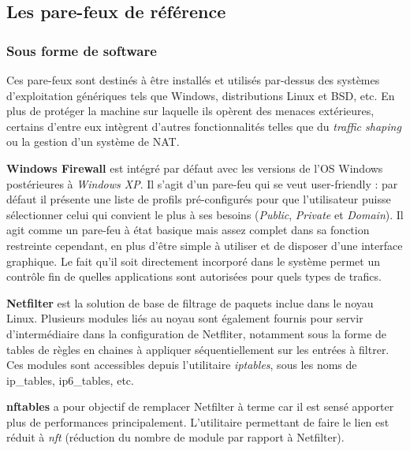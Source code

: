 \documentclass[]{article}
\newcommand{\minit}[1]{\noindent{\small\textbf{ \underline{#1}}}\vspace{0.2cm}}
\begin{document}
\newpage
\subsection{Les pare-feux de référence}

\subsubsection{Sous forme de software}

\par Ces pare-feux sont destinés à être installés et utilisés par-dessus des systèmes d'exploitation génériques tels que Windows, distributions Linux et BSD, etc. En plus de protéger la machine sur laquelle ils opèrent des menaces extérieures, certains d'entre eux intègrent d'autres fonctionnalités telles que du \textit{traffic shaping} ou la gestion d'un système de NAT.\\

\minit{Windows}

\par \textbf{Windows Firewall} est intégré par défaut avec les versions de l'OS Windows postérieures à \textit{Windows XP}. Il s'agit d'un pare-feu qui se veut \og user-friendly \fg : par défaut il présente une liste de profils pré-configurés pour que l'utilisateur puisse sélectionner celui qui convient le plus à ses besoins (\textit{Public}, \textit{Private} et \textit{Domain}). Il agit comme un pare-feu à état basique mais assez complet dans sa fonction restreinte cependant, en plus d'être simple à utiliser et de disposer d'une interface graphique. Le fait qu'il soit directement incorporé dans le système permet un contrôle fin de quelles applications sont autorisées pour quels types de trafics.\\

\minit{Linux}

\par \textbf{Netfilter} est la solution de base de filtrage de paquets inclue dans le noyau Linux. Plusieurs modules liés au noyau sont également fournis pour servir d'intermédiaire dans la configuration de Netfliter, notamment sous la forme de tables de règles en chaines à appliquer séquentiellement sur les entrées à filtrer. Ces modules sont accessibles depuis l'utilitaire \textit{iptables}, sous les noms de ip\_tables, ip6\_tables, etc.\\

\par \textbf{nftables} a pour objectif de remplacer Netfilter à terme car il est sensé apporter plus de performances principalement. L'utilitaire permettant de faire le lien est réduit à \textit{nft} (réduction du nombre de module par rapport à Netfilter).\\
\end{document}
